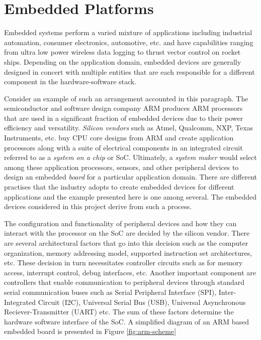 \section{Embedded Platforms}

Embedded systems perform a varied mixture of applications including industrial automation, consumer electronics, automotive, etc. and have capabilities ranging from ultra low power wireless data logging to thrust vector control on rocket ships. Depending on the application domain, embedded devices are generally designed in concert with multiple entities that are each responsible for a different component in the hardware-software stack.

Consider an example of such an arrangement accounted in this paragraph. The semiconductor and software design company ARM produces ARM processors that are used in a significant fraction of embedded devices due to their power efficiency and versatility. \textit{Silicon vendors} such as Atmel, Qualcomm, NXP, Texas Instruments, etc. buy CPU core designs from ARM and create application processors along with a suite of electrical components in an integrated circuit referred to as a \textit{system on a chip} or SoC. Ultimately, a \textit{system maker} would select among these application processors, sensors, and other peripheral devices to design an embedded \textit{board} for a particular application domain. There are different practises that the industry adopts to create embedded devices for different applications and the example presented here is one among several. The embedded devices considered in this project derive from such a process.

The configuration and functionality of peripheral devices and how they can interact with the processor on the SoC are decided by the silicon vendor. There are several architectural factors that go into this decision such as the computer organization, memory addressing model, supported instruction set architectures, etc. These decision in turn necessitates controller circuits such as for memory access, interrupt control, debug interfaces, etc. Another important component are controllers that enable communication to peripheral devices through standard serial communication buses such as Serial Peripheral Interface (SPI), Inter-Integrated Circuit (I2C), Universal Serial Bus (USB), Universal Asynchronous Reciever-Transmitter (UART) etc. The sum of these factors determine the hardware software interface of the SoC. A simplified diagram of an ARM based embedded board is presented in Figure \ref{fig:arm-scheme}

